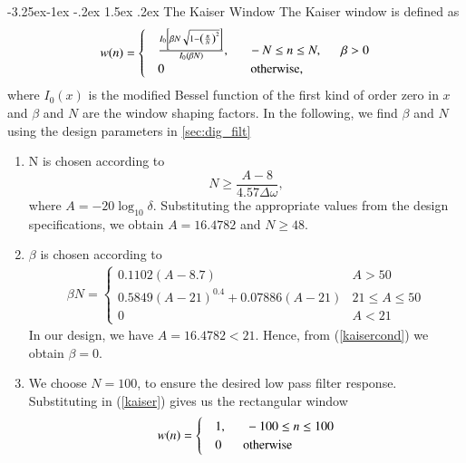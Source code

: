 \documentclass[article]{IEEEtran}
\makeatletter
\theoremstyle{remark}
\numberwithin{equation}{subsection}
\renewcommand\subsection{\@startsection{subsection}{2}{\z@}%
    {-3.25ex\@plus -1ex \@minus -.2ex}%
    {1.5ex \@plus .2ex}%
    {\normalfont\large\bfseries}}
\makeatother
\begin{document}
\subsection{The Kaiser Window}
The Kaiser window is defined as
\begin{align}
w(n) =
\begin{cases}
\label{kaiser}
& \frac{I_0\left[ \beta N \sqrt{1 - \left(\frac{n}{N}\right)^2} \right]}{I_0(\beta N)},
\indent -N \leq n \leq N, \indent \beta > 0  \\
& 0 \hspace{2.4cm}\text{otherwise,}
\end{cases}
\end{align}
where $I_0(x)$ is the modified Bessel function of the first kind of order zero in $x$ and $\beta$
and $N$ are the window shaping factors.  In the following,
we find $\beta$ and $N$ using the design parameters in \ref{sec:dig_filt}

\begin{enumerate}
\item  N is chosen according to
\begin{equation}
N \geq \frac{A-8}{4.57\Delta \omega},
\end{equation}
where $A = -20\log_{10}\delta$.  Substituting the appropriate values from the design specifications, we obtain
$A = 16.4782$ and $N \geq 48$.

\item  $\beta$ is chosen according to
\begin{eqnarray}
\label{kaisercond}
\beta N = \left\{ \begin{array}{ll} 0.1102(A-8.7) & A > 50 \\
0.5849(A-21)^{0.4}+ 0.07886(A-21) & 21 \leq A \leq 50 \\
0 & A < 21\end{array} \right.
\end{eqnarray}
In our design, we have $A = 16.4782 < 21$.  Hence, from (\ref{kaisercond}) we obtain $\beta = 0$.  

\item We choose $N = 100$, to ensure the desired low pass filter response.  Substituting in (\ref{kaiser})
gives us the rectangular window
\begin{align}
w(n) =
\begin{cases}
& 1, \indent -100 \leq n \leq 100 \\
& 0 \hspace{6mm} \mbox{otherwise}
\end{cases}\label{rect}
\end{align}
\end{enumerate}
\end{document}
